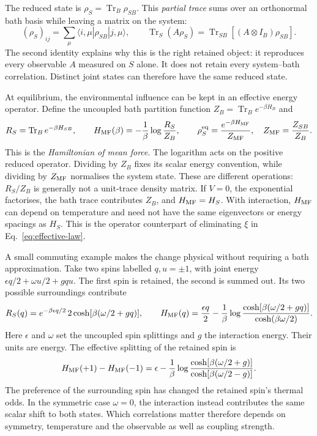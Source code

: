 The reduced state is $\rho_S=\operatorname{Tr}_B\rho_{SB}$. This \emph{partial trace} sums over an orthonormal bath basis while leaving a matrix on the system:
\begin{equation}
 (\rho_S)_{ij}=\sum_\mu
 \langle i,\mu|\rho_{SB}|j,\mu\rangle,
 \qquad
 \operatorname{Tr}_S(A\rho_S)
 =\operatorname{Tr}_{SB}[(A\otimes I_B)\rho_{SB}].
 \label{eq:partial-trace}
\end{equation}
The second identity explains why this is the right retained object: it reproduces every observable $A$ measured on $S$ alone. It does not retain every system--bath correlation. Distinct joint states can therefore have the same reduced state.

At equilibrium, the environmental influence can be kept in an effective energy operator. Define the uncoupled bath partition function $Z_B=\operatorname{Tr}_B e^{-\beta H_B}$ and
\begin{equation}
 R_S=\operatorname{Tr}_B e^{-\beta H_{SB}},
 \qquad
 H_{\rm MF}(\beta)=-\frac1\beta\log\frac{R_S}{Z_B},
 \qquad
 \rho_S^{\rm eq}=\frac{e^{-\beta H_{\rm MF}}}{Z_{\rm MF}},
 \quad Z_{\rm MF}=\frac{Z_{SB}}{Z_B}.
 \label{eq:mean-force-normalised}
\end{equation}
This is the \emph{Hamiltonian of mean force}. The logarithm acts on the positive reduced operator. Dividing by $Z_B$ fixes its scalar energy convention, while dividing by $Z_{\rm MF}$ normalises the system state. These are different operations: $R_S/Z_B$ is generally not a unit-trace density matrix. If $V=0$, the exponential factorises, the bath trace contributes $Z_B$, and $H_{\rm MF}=H_S$. With interaction, $H_{\rm MF}$ can depend on temperature and need not have the same eigenvectors or energy spacings as $H_S$. This is the operator counterpart of eliminating $\xi$ in Eq.~\eqref{eq:effective-law}.~\cite{McCaulded509}

A small commuting example makes the change physical without requiring a bath approximation. Take two spins labelled $q,u=\pm1$, with joint energy $\epsilon q/2+\omega u/2+gqu$. The first spin is retained, the second is summed out. Its two possible surroundings contribute
\[
 R_S(q)=e^{-\beta\epsilon q/2}\,2\cosh[\beta(\omega/2+gq)],
 \qquad
 H_{\rm MF}(q)=\frac{\epsilon q}{2}
 -\frac1\beta\log\frac{\cosh[\beta(\omega/2+gq)]}{\cosh(\beta\omega/2)}.
\]
Here $\epsilon$ and $\omega$ set the uncoupled spin splittings and $g$ the interaction energy. Their units are energy. The effective splitting of the retained spin is
\[
 H_{\rm MF}(+1)-H_{\rm MF}(-1)
 =\epsilon-\frac1\beta\log
 \frac{\cosh[\beta(\omega/2+g)]}{\cosh[\beta(\omega/2-g)]}.
\]
The preference of the surrounding spin has changed the retained spin's thermal odds. In the symmetric case $\omega=0$, the interaction instead contributes the same scalar shift to both states. Which correlations matter therefore depends on symmetry, temperature and the observable as well as coupling strength.

